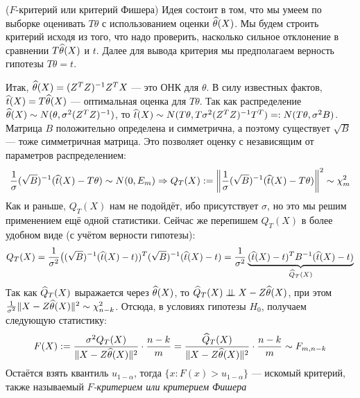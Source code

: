 \begin{solution} ($F$-критерий или критерий Фишера)
	Идея состоит в том, что мы умеем по выборке оценивать $T\theta$ с использованием оценки $\widehat{\theta}(X)$. Мы будем строить критерий исходя из того, что надо проверить, насколько сильное отклонение в сравнении $T\widehat{\theta}(X)$ и $t$. Далее для вывода критерия мы предполагаем верность гипотезы $T\theta = t$.
	
	Итак, $\widehat{\theta}(X) = (Z^TZ)^{-1}Z^TX$ --- это ОНК для $\theta$. В силу известных фактов, $\widehat{t}(X) = T\widehat{\theta}(X)$ --- оптимальная оценка для $T\theta$. Так как распределение $\widehat{\theta}(X) \sim N(\theta, \sigma^2(Z^TZ)^{-1})$, то $\widehat{t}(X) \sim N(T\theta, T\sigma^2(Z^TZ)^{-1}T^T) =: N(T\theta, \sigma^2B)$. Матрица $B$ положительно определена и симметрична, а поэтому существует $\sqrt{B}$ --- тоже симметричная матрица. Это позволяет оценку с независящим от параметров распределением:
	\[
		\frac{1}{\sigma}(\sqrt{B})^{-1}(\widehat{t}(X) - T\theta) \sim N(0, E_m) \Rightarrow Q_T(X) := \left\|\frac{1}{\sigma}(\sqrt{B})^{-1}(\widehat{t}(X) - T\theta)\right\|^2 \sim \chi_m^2
	\]
	Как и раньше, $Q_T(X)$ нам не подойдёт, ибо присутствует $\sigma$, но это мы решим применением ещё одной статистики. Сейчас же перепишем $Q_T(X)$ в более удобном виде (с учётом верности гипотезы):
	\[
		Q_T(X) = \frac{1}{\sigma^2} \big((\sqrt{B})^{-1}(\widehat{t}(X) - t))^T(\sqrt{B})^{-1}(\widehat{t}(X) - t) = \frac{1}{\sigma^2}\underbrace{(\widehat{t}(X) - t)^TB^{-1}(\widehat{t}(X) - t)}_{\widehat{Q}_T(X)}
	\]
	Так как $\widehat{Q}_T(X)$ выражается через $\widehat{\theta}(X)$, то $\widehat{Q}_T(X) \perp\mkern-9.5mu\perp X - Z\widehat{\theta}(X)$, при этом $\frac{1}{\sigma^2}\|X - Z\widehat{\theta}(X)\|^2 \sim \chi_{n - k}^2$. Отсюда, в условиях гипотезы $H_0$, получаем следующую статистику:
	\[
		F(X) := \frac{\sigma^2 Q_T(X)}{\|X - Z\widehat{\theta}(X)\|^2} \cdot \frac{n - k}{m} = \frac{\widehat{Q}_T(X)}{\|X - Z\widehat{\theta}(X)\|^2} \cdot \frac{n - k}{m} \sim F_{m, n - k}
	\]
	Остаётся взять квантиль $u_{1 - \alpha}$, тогда $\{x \colon F(x) > u_{1 - \alpha}\}$ --- искомый критерий, также называемый \textit{$F$-критерием или критерием Фишера}
\end{solution}

